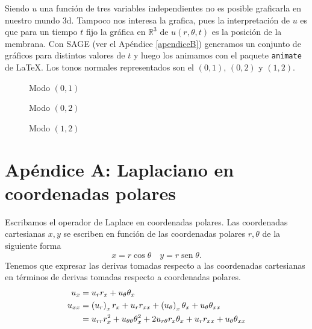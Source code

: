 \documentclass{article}
\DeclareMathOperator{\sen}{sen}
\begin{document}

Siendo $u$ una función de tres variables independientes no es posible graficarla en nuestro mundo 3d. Tampoco nos interesa la grafica, pues la interpretación de $u$ es que para un tiempo $t$ fijo la gráfica en $\mathbb{R}^3$ de  $u(r,\theta,t)$ es la posición de la membrana.  Con SAGE (ver el Apéndice \ref{apendiceB}) generamos un conjunto de gráficos para distintos valores de $t$ y luego los animamos con el paquete \texttt{animate} de \LaTeX. Los tonos normales representados son el $(0,1)$, $(0,2)$ y $(1,2)$.

\begin{figure}[h]
  \begin{center}
\end{center} 
\caption{Modo $(0,1)$}
\end{figure}


  \begin{figure}
 \begin{center}
\end{center}  
\caption{Modo $(0,2)$}
\end{figure}

    \begin{figure}
 \begin{center}
\end{center}  
\caption{Modo $(1,2)$}
\end{figure}

\newpage
\section{Apéndice A: Laplaciano en coordenadas polares}\label{eq:apendice}
Escribamos el operador de Laplace en coordenadas polares. Las coordenadas cartesianas  $x,y$ se escriben en función de las coordenadas polares $r,\theta$ de la siguiente forma
\[x=r\cos\theta\quad y=r\sen\theta.\]
Tenemos que expresar las derivas tomadas respecto a las coordenadas cartesianas en términos de derivas tomadas respecto a coordenadas polares.  
\begin{align}
  u_x&=u_rr_x+u_{\theta}\theta_x\notag\\
  u_{xx}&=\left(u_r\right)_xr_x+u_rr_{xx}+\left(u_{\theta}\right)_x\theta_x+u_{\theta}\theta_{xx}\notag\\
&=u_{rr}r_x^2+u_{\theta\theta}\theta_x^2+2u_{r\theta}r_x\theta_x+u_rr_{xx}+u_{\theta}\theta_{xx}\label{eq:lapla_pol}
\end{align}
\end{document}
